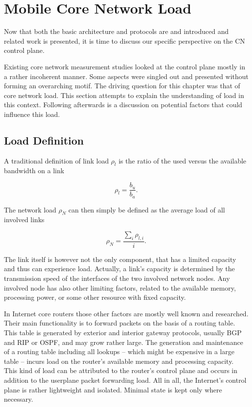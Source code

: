 \section{Mobile Core Network Load}
\label{c4:loaddefinition}

Now that both the basic architecture and protocols are and introduced and related work is presented, it is time to discuss our specific perspective on the \gls{CN} control plane.

Existing core network measurement studies looked at the control plane mostly in a rather incoherent manner. Some aspects were singled out and presented without forming an overarching motif. The driving question for this chapter was that of core network load. This section attempts to explain the understanding of load in this context. Following afterwards is a discussion on potential factors that could influence this load.


\subsection{Load Definition}

A traditional definition of link load $\rho_{l}$ is the ratio of the used versus the available bandwidth on a link

\begin{equation}
\rho_{l} = \frac{b_{u}}{b_{a}}\text{.}
\end{equation}

The network load $\rho_{N}$ can then simply be defined as the average load of all involved links

\begin{equation}
\rho_{N} = \frac{\sum_{i} \rho_{l,i}}{i}\text{.}
\end{equation}

The link itself is however not the only component, that has a limited capacity and thus can experience load. Actually, a link's capacity is determined by the transmission speed of the interfaces of the two involved network nodes. Any involved node has also other limiting factors, related to the available memory, processing power, or some other resource with fixed capacity.

In Internet core routers those other factors are mostly well known and researched. Their main functionality is to forward packets on the basis of a routing table. This table is generated by exterior and interior gateway protocols, usually \gls{BGP} and \gls{RIP} or \gls{OSPF}, and may grow rather large. The generation and maintenance of a routing table including all lookups -- which might be expensive in a large table -- incurs load on the router's available memory and processing capacity. This kind of load can be attributed to the router's control plane and occurs in addition to the userplane packet forwarding load. All in all, the Internet's control plane is rather lightweight and isolated. Minimal state is kept only where necessary.

